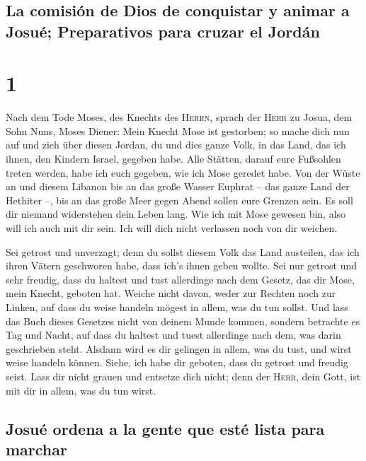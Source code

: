 \hypertarget{la-comisiuxf3n-de-dios-de-conquistar-y-animar-a-josuuxe9-preparativos-para-cruzar-el-jorduxe1n}{%
\subsection{La comisión de Dios de conquistar y animar a Josué;
Preparativos para cruzar el
Jordán}\label{la-comisiuxf3n-de-dios-de-conquistar-y-animar-a-josuuxe9-preparativos-para-cruzar-el-jorduxe1n}}

\hypertarget{section}{%
\section{1}\label{section}}

 Nach dem Tode Moses, des Knechts des \textsc{Herrn},
sprach der \textsc{Herr} zu Josua, dem Sohn Nuns, Moses Diener:
 Mein Knecht Mose ist gestorben; so mache dich nun auf und
zieh über diesen Jordan, du und dies ganze Volk, in das Land, das ich
ihnen, den Kindern Israel, gegeben habe.  Alle Stätten,
darauf eure Fußsohlen treten werden, habe ich euch gegeben, wie ich Mose
geredet habe.  Von der Wüste an und diesem Libanon bis an
das große Wasser Euphrat -- das ganze Land der Hethiter --, bis an das
große Meer gegen Abend sollen eure Grenzen sein.  Es soll
dir niemand widerstehen dein Leben lang. Wie ich mit Mose gewesen bin,
also will ich auch mit dir sein. Ich will dich nicht verlassen noch von
dir weichen.

 Sei getrost und unverzagt; denn du sollst diesem Volk das
Land austeilen, das ich ihren Vätern geschworen habe, dass ich's ihnen
geben wollte.  Sei nur getrost und sehr freudig, dass du
haltest und tust allerdinge nach dem Gesetz, das dir Mose, mein Knecht,
geboten hat. Weiche nicht davon, weder zur Rechten noch zur Linken, auf
dass du weise handeln mögest in allem, was du tun sollst. 
Und lass das Buch dieses Gesetzes nicht von deinem Munde kommen, sondern
betrachte es Tag und Nacht, auf dass du haltest und tuest allerdinge
nach dem, was darin geschrieben steht. Alsdann wird es dir gelingen in
allem, was du tust, und wirst weise handeln können. 
Siehe, ich habe dir geboten, dass du getrost und freudig seist. Lass dir
nicht grauen und entsetze dich nicht; denn der \textsc{Herr}, dein Gott,
ist mit dir in allem, was du tun wirst.

\hypertarget{josuuxe9-ordena-a-la-gente-que-estuxe9-lista-para-marchar}{%
\subsection{Josué ordena a la gente que esté lista para
marchar}\label{josuuxe9-ordena-a-la-gente-que-estuxe9-lista-para-marchar}}

